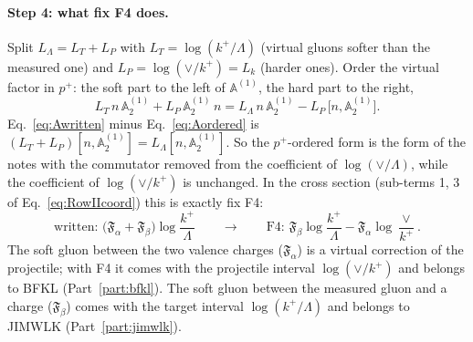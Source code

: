\paragraph{Step 4: what fix F4 does.} Split $L_\Lambda=L_T+L_P$ with $L_T=\log(k^+/\Lambda)$ (virtual gluons softer than the measured one) and $L_P=\log(\vee/k^+)=L_k$ (harder ones). Order the virtual factor in $p^+$: the soft part to the left of $\mathbb A^{(1)}$, the hard part to the right,
\begin{equation}
L_T\,n\,\mathbb A^{(1)}_2+L_P\,\mathbb A^{(1)}_2\,n=L_\Lambda\,n\,\mathbb A^{(1)}_2-L_P\,\big[n,\mathbb A^{(1)}_2\big].
\label{eq:Aordered}
\end{equation}
Eq.~\eqref{eq:Awritten} minus Eq.~\eqref{eq:Aordered} is $(L_T+L_P)[n,\mathbb A^{(1)}_2]=L_\Lambda[n,\mathbb A^{(1)}_2]$. So the $p^+$-ordered form is the form of the notes with the commutator removed from the coefficient of $\log(\vee/\Lambda)$, while the coefficient of $\log(\vee/k^+)$ is unchanged. In the cross section (sub-terms 1, 3 of Eq.~\eqref{eq:RowIIcoord}) this is exactly fix F4:
\begin{equation}
\text{written: }\big(\mathfrak F_\alpha+\mathfrak F_\beta\big)\log\frac{k^+}{\Lambda}\qquad\longrightarrow\qquad\text{F4: }\mathfrak F_\beta\log\frac{k^+}{\Lambda}-\mathfrak F_\alpha\log\frac{\vee}{k^+}.
\label{eq:F4meaning}
\end{equation}
The soft gluon between the two valence charges ($\mathfrak F_\alpha$) is a virtual correction of the projectile; with F4 it comes with the projectile interval $\log(\vee/k^+)$ and belongs to BFKL (Part~\ref{part:bfkl}). The soft gluon between the measured gluon and a charge ($\mathfrak F_\beta$) comes with the target interval $\log(k^+/\Lambda)$ and belongs to JIMWLK (Part~\ref{part:jimwlk}).

